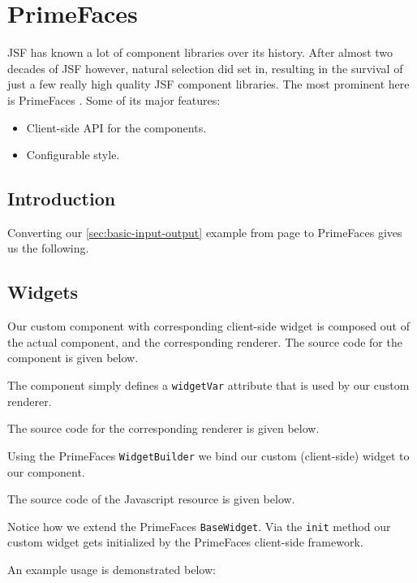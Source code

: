 %

\chapter{PrimeFaces}

JSF has known a lot of component libraries over its history.
After almost two decades of JSF however, natural selection did set in,
resulting in the survival of just a few really high quality JSF component libraries.
The most prominent here is PrimeFaces \cite{PrimeFaces}.
Some of its major features:
\begin{itemize}
	\item Client-side API for the components.
	\item Configurable style.
\end{itemize}

\section{Introduction}
Converting our \ref{sec:basic-input-output}  example from page \pageref{sec:basic-input-output} to PrimeFaces gives us the following.


\section{Widgets}
Our custom component with corresponding client-side widget is composed out of the actual component, and the corresponding renderer.
The source code for the component is given below.

The component simply defines a \texttt{widgetVar} attribute that is used by our custom renderer.

The source code for the corresponding renderer is given below.

Using the PrimeFaces \texttt{WidgetBuilder} we bind our custom (client-side) widget to our component.

The source code of the Javascript resource is given below.

Notice how we extend the PrimeFaces \texttt{BaseWidget}. Via the \texttt{init} method our custom widget gets initialized by the PrimeFaces client-side framework.

An example usage is demonstrated below:
